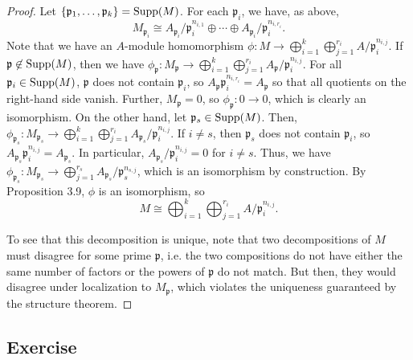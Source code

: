 \begin{proof}
Let $\{\mathfrak{p}_1,\ldots,\mathfrak{p}_k\} = \operatorname{Supp}(M)$. For each $\mathfrak{p}_i$, we have, as above,
$$M_{\mathfrak{p}_i} \cong A_{\mathfrak{p}_i}/\mathfrak{p}_i^{n_{i,1}} \oplus \cdots \oplus A_{\mathfrak{p}_i}/\mathfrak{p}_i^{n_{i,r_i}}.$$
Note that we have an $A$-module homomorphism $\phi : M \to \bigoplus_{i=1}^k \bigoplus_{j=1}^{r_i} A/\mathfrak{p}_i^{n_{i,j}}$. If $\mathfrak{p} \not\in \operatorname{Supp}(M)$,
then we have $\phi_{\mathfrak{p}} : M_{\mathfrak{p}} \to \bigoplus_{i=1}^k \bigoplus_{j=1}^{r_i} A_{\mathfrak{p}}/\mathfrak{p}_i^{n_{i,j}}$. For all $\mathfrak{p}_i \in \operatorname{Supp}(M)$,
$\mathfrak{p}$ does not contain $\mathfrak{p}_i$, so $A_{\mathfrak{p}}\mathfrak{p}_i^{n_{i,r_i}} = A_{\mathfrak{p}}$ so that all quotients on the right-hand side vanish. Further,
$M_{\mathfrak{p}} = 0$, so $\phi_{\mathfrak{p}} : 0 \to 0$, which is clearly an isomorphism. On the other hand, let $\mathfrak{p}_s \in \operatorname{Supp}(M)$. Then,
$\phi_{\mathfrak{p}_s} : M_{\mathfrak{p}_s} \to \bigoplus_{i=1}^k \bigoplus_{j=1}^{r_i} A_{\mathfrak{p}_s}/\mathfrak{p}_i^{n_{i,j}}$. If $i \neq s$, then $\mathfrak{p}_s$ does
not contain $\mathfrak{p}_i$, so $A_{\mathfrak{p}_s}\mathfrak{p}_i^{n_{i,j}} = A_{\mathfrak{p}_s}$. In particular, $A_{\mathfrak{p}_s}/\mathfrak{p}_i^{n_{i,j}} = 0$ for $i \neq s$.
Thus, we have $\phi_{\mathfrak{p}_s} : M_{\mathfrak{p}_s} \to \bigoplus_{j=1}^{r_s} A_{\mathfrak{p}_s}/\mathfrak{p}_s^{n_{s,j}}$, which is an isomorphism by construction. By
Proposition 3.9, $\phi$ is an isomorphism, so 
$$M \cong \bigoplus_{i=1}^k \bigoplus_{j=1}^{r_i} A/\mathfrak{p}_i^{n_{i,j}}.$$

To see that this decomposition is unique, note that two decompositions of $M$ must disagree for some prime $\mathfrak{p}$, i.e. the two compositions do not have either the same 
number of factors or the powers of $\mathfrak{p}$ do not match. But then, they would disagree under localization to $M_{\mathfrak{p}}$, which violates the uniqueness guaranteed 
by the structure theorem.
\end{proof}

\subsection{Exercise}\label{9.7}

